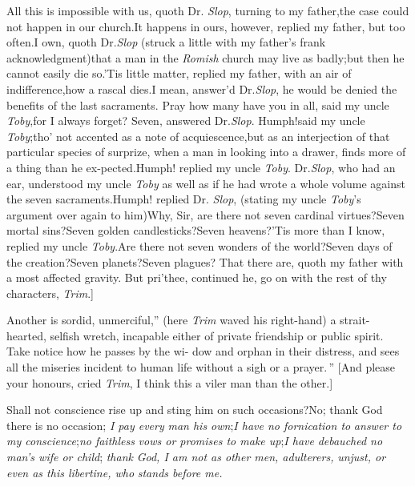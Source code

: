 \documentclass{article}
\begin{document}
All this is impossible with us, quoth Dr.\@
\textit{Slop}, turning to my father,\tsk the case could
not happen in our church.\tsh It\break
happens in ours,
however, replied my father, but too often.\tsh I own,
quoth Dr.\@ \textit{Slop} (struck a little with my
father’s frank acknowledgment)\tsk that a man in the
\textit{Romish} church may live as badly;\tsk\break but
then he cannot easily die so.\tsh ’Tis little matter,
replied my father, with an air of indifference,\tsk how
a rascal dies.\tsk\break I mean, answer’d Dr.\@ \textit{Slop},
he would be denied the benefits of the last
sacraments.\break
\tsk Pray how many have you in all, said my uncle
\textit{Toby},\tsk for I always forget?\tsk\break
Seven, answered Dr.\@ \textit{Slop}.\tsk
Humph!\tsk\break said my
uncle \textit{Toby};\tsk tho’ not accented as a note of
acquiescence,\tsk but as an interjection of that
particular species of surprize, when a man in looking
into a drawer, finds more of a thing than he
ex-\break pected.\tsk Humph! replied my uncle \textit{Toby}.
Dr.\@ \textit{Slop}, who had an ear, understood my uncle
\textit{Toby} as well as if he had wrote a whole volume
against the seven sacraments.\tsh Humph! replied Dr.\@
\textit{Slop}, (stating my uncle \textit{Toby}’s
argument over again to him)\tsh Why, Sir, are there not
seven cardinal virtues?\tsh Seven mortal sins?\tsh Seven
golden candlesticks?\tsh Seven heavens?\tsh ’Tis\break
more than I know, replied my uncle\break
\textit{Toby}.\tsh Are
there not seven wonders of the world?\tsh Seven days of
the creation?\tsh Seven planets?\tsh Seven plagues?\tsh
That there are, quoth my father with a most affected
gravity. But pri’thee, continued he, go on with the rest
of thy characters, \textit{Trim}.]

\lqq Another is sordid, unmerciful,” (here\break
\textit{Trim} waved his right-hand) \lqq a strait-\break
\lqq hearted, selfish wretch, incapable either\break
\lqq of private friendship or public spirit.\break
\lqq Take notice how he passes by the wi-\break
\lqq dow and orphan in their distress, and\break
\lqq sees all the miseries incident to human\break
\lqq life without a sigh or a prayer.\,” [And
please your honours, cried
\textit{Trim}, I think this a viler man than the other.]

\lqq Shall not conscience rise up and sting\break
\lqq him on such occasions?\tsh No; thank\break
\lqq God there is no occasion; \textit{I pay every}\break
\lqq \textit{man his own};\textit{\tsk I have no fornication to}\break
\lqq \textit{answer to my conscience};\textit{\tsk no faithless}\break
\lqq \textit{vows or promises to make up};\textit{\tsk I have}\break
\lqq \textit{debauched no man’s wife or child}; \textit{thank}\break
\lqq \textit{God, I am not as other men, adulterers,}\break
\lqq \textit{unjust, or even as this libertine, who}\break
\lqq \textit{stands before me.}
\end{document}
